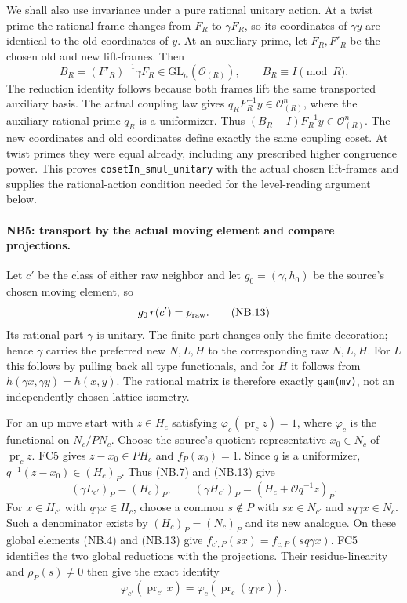 We shall also use invariance under a pure rational unitary action.
At a twist prime the rational frame changes from $F_R$ to $\gamma F_R$,
so its coordinates of $\gamma y$ are identical to the old coordinates
of $y$. At an auxiliary prime, let $F_R,F'_R$ be the chosen old and
new lift-frames. Then
\[
 B_R=(F'_R)^{-1}\gamma F_R\in\mathrm{GL}_n(\mathcal O_{(R)}),
 \qquad B_R\equiv I\pmod R.                          \tag{NB.12}
\]
The reduction identity follows because both frames lift the same
transported auxiliary basis. The actual coupling law gives
$q_R F_R^{-1}y\in\mathcal O_{(R)}^n$, where the auxiliary rational
prime $q_R$ is a uniformizer. Thus
$(B_R-I)F_R^{-1}y\in\mathcal O_{(R)}^n$. The new coordinates and old
coordinates define exactly the same coupling coset. At twist primes
they were equal already, including any prescribed higher congruence
power. This proves \texttt{cosetIn\_smul\_unitary} with the actual
chosen lift-frames and supplies the rational-action condition needed
for the level-reading argument below.

\paragraph{NB5: transport by the actual moving element and compare projections.}
Let $c'$ be the class of either raw neighbor and let
$g_0=(\gamma,h_0)$ be the source's chosen moving element, so
\[
                      g_0\,r(c')=p_{\rm raw}.        \tag{NB.13}
\]
Its rational part $\gamma$ is unitary. The finite part changes only
the finite decoration; hence $\gamma$ carries the preferred new
$N,L,H$ to the corresponding raw $N,L,H$. For $L$ this follows by
pulling back all type functionals, and for $H$ it follows from
$h(\gamma x,\gamma y)=h(x,y)$. The rational matrix is therefore
exactly \texttt{gam(mv)}, not an independently chosen lattice isometry.

For an up move start with $z\in H_c$ satisfying
$\varphi_c(\operatorname{pr}_c z)=1$, where $\varphi_c$ is the
functional on $N_c/PN_c$. Choose the source's quotient representative
$x_0\in N_c$ of $\operatorname{pr}_c z$. FC5 gives
$z-x_0\in PH_c$ and $f_P(x_0)=1$. Since $q$ is a uniformizer,
$q^{-1}(z-x_0)\in(H_c)_P$. Thus (NB.7) and (NB.13) give
\[
 (\gamma L_{c'})_P=(H_c)_P,\qquad
 (\gamma H_{c'})_P=(H_c+\mathcal Oq^{-1}z)_P.         \tag{NB.14}
\]
For $x\in H_{c'}$ with $q\gamma x\in H_c$, choose a common
$s\notin P$ with $sx\in N_{c'}$ and $sq\gamma x\in N_c$.
Such a denominator exists by $(H_c)_P=(N_c)_P$ and its new analogue.
On these global elements (NB.4) and (NB.13) give
$f_{c',P}(sx)=f_{c,P}(sq\gamma x)$. FC5 identifies the two global
reductions with the projections. Their residue-linearity and
$\rho_P(s)\ne0$ then give the exact identity
\[
 \varphi_{c'}(\operatorname{pr}_{c'}x)
       =\varphi_c(\operatorname{pr}_c(q\gamma x)).    \tag{NB.15}
\]

